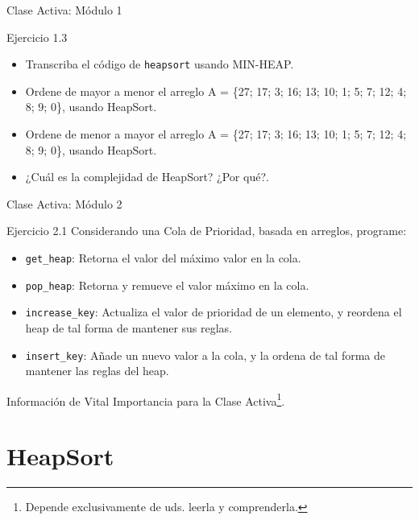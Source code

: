 \documentclass{beamer}
\begin{document}
\begin{frame}[fragile]{Clase Activa: Módulo 1}
\begin{exampleblock}{Ejercicio 1.3}
\begin{itemize}
\item Transcriba el código de \texttt{heapsort} usando MIN-HEAP.
\item Ordene de mayor a menor el arreglo A = \{27; 17; 3; 16; 13; 10; 1; 5; 7; 12; 4; 8; 9; 0\}, usando HeapSort.
\item Ordene de menor a mayor el arreglo A = \{27; 17; 3; 16; 13; 10; 1; 5; 7; 12; 4; 8; 9; 0\}, usando HeapSort.
\item ¿Cuál es la complejidad de HeapSort? ¿Por qué?. 
\end{itemize}
\end{exampleblock}
\end{frame}


\begin{frame}[fragile]{Clase Activa: Módulo 2}
\begin{exampleblock}{Ejercicio 2.1}
Considerando una Cola de Prioridad, basada en arreglos, programe:
\begin{itemize}
\item \texttt{get\_heap}: Retorna el valor del máximo valor en la cola.
\item \texttt{pop\_heap}: Retorna y remueve el valor máximo en la cola. 
\item \texttt{increase\_key}: Actualiza el valor de prioridad de un elemento, y reordena el heap de tal forma de mantener sus reglas. 
\item \texttt{insert\_key}: Añade un nuevo valor a la cola, y la ordena de tal forma de mantener las reglas del heap.
\end{itemize}
\end{exampleblock}
\end{frame}


\begin{frame}
\centering \Huge Información de Vital Importancia para la Clase Activa\footnote{Depende exclusivamente de uds. leerla y comprenderla.}.
\end{frame}

\part{HeapSort}
\end{document}

